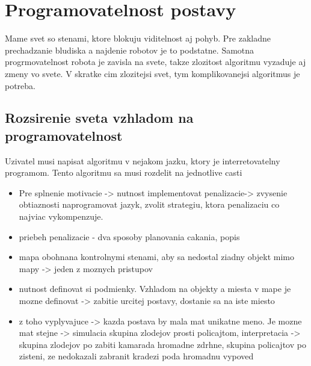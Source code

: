 \documentclass[a4paper,11pt,final]{report}
\begin{document}
\section{Programovatelnost postavy}
Mame svet so stenami, ktore blokuju viditelnost aj pohyb. Pre zakladne prechadzanie bludiska a najdenie robotov je to podstatne. Samotna progrmovatelnost robota je zavisla na svete, takze zlozitost algoritmu vyzaduje aj zmeny vo svete. V skratke cim zlozitejsi svet, tym komplikovanejsi algoritmus je potreba.
\subsection{Rozsirenie sveta vzhladom na programovatelnost}
Uzivatel musi napisat algoritmu v nejakom jazku, ktory je interretovatelny programom. Tento algoritmu sa musi rozdelit na jednotlive casti
\begin{itemize}
\item Pre splnenie motivacie -> nutnost  implementovat penalizacie-> zvysenie obtiaznosti naprogramovat jazyk, zvolit strategiu, ktora penalizaciu co najviac vykompenzuje. 
\item priebeh penalizacie  - dva sposoby planovania cakania, popis
\item mapa obohnana kontrolnymi stenami, aby sa nedostal ziadny objekt mimo mapy -> jeden z moznych pristupov
\item nutnost definovat si podmienky. Vzhladom na objekty a miesta v mape je mozne definovat -> zabitie urcitej postavy, dostanie sa na iste miesto
\item z toho vyplyvajuce -> kazda postava by mala mat unikatne meno. Je mozne mat stejne -> simulacia skupina zlodejov prosti policajtom, interpretacia -> skupina zlodejov po zabiti kamarada hromadne zdrhne, skupina policajtov po zisteni, ze nedokazali zabranit kradezi poda hromadnu vypoved
\end{itemize}
\end{document}
